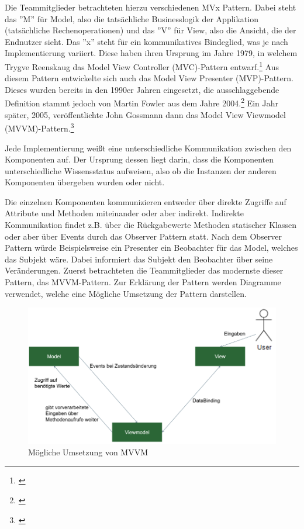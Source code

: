 Die Teammitglieder betrachteten hierzu verschiedenen MVx Pattern. Dabei steht das ''M'' für Model, also die tatsächliche Businesslogik der Applikation (tatsächliche Rechenoperationen) und das ''V'' für View, also die Ansicht, die der Endnutzer sieht. Das ''x'' steht für ein kommunikatives Bindeglied, was je nach Implementierung variiert. Diese haben ihren Ursprung im Jahre 1979, in welchem Trygve Reenskaug das Model View Controller (MVC)-Pattern entwarf.\footnote{\cite[vgl.][]{c2MVC}} Aus diesem Pattern entwickelte sich auch das Model View Presenter (MVP)-Pattern. Dieses wurden bereits in den 1990er Jahren eingesetzt, die ausschlaggebende Definition stammt jedoch von Martin Fowler aus dem Jahre 2004.\footnote{\cite[vgl.][]{FowlerMVP}} Ein Jahr später, 2005, veröffentlichte John Gossmann dann das Model View Viewmodel (MVVM)-Pattern.\footnote{\cite[vgl.][]{HeiseMVVM}}

Jede Implementierung weißt eine unterschiedliche Kommunikation zwischen den Komponenten auf. Der Ursprung dessen liegt darin, dass die Komponenten unterschiedliche Wissensstatus aufweisen, also ob die Instanzen der anderen Komponenten übergeben wurden oder nicht. 

Die einzelnen Komponenten kommunizieren entweder über direkte Zugriffe auf Attribute und Methoden miteinander oder aber indirekt. Indirekte Kommunikation findet z.B. über die Rückgabewerte Methoden statischer Klassen oder aber über Events durch das Observer Pattern statt. Nach dem Observer Pattern würde Beispielsweise ein Presenter ein Beobachter für das Model, welches das Subjekt wäre. Dabei informiert das Subjekt den Beobachter über seine Veränderungen. 
Zuerst betrachteten die Teammitglieder das modernste dieser Pattern, das MVVM-Pattern. Zur Erklärung der Pattern werden Diagramme verwendet, welche eine Mögliche Umsetzung der Pattern darstellen.


\begin{figure}[!h]
	\includegraphics[width=1\columnwidth]{img/design-pattern-mvvm}
	\caption[Mögliche Umsetzung von MVVM ]{Mögliche Umsetzung von MVVM\footnotemark}
\end{figure}

